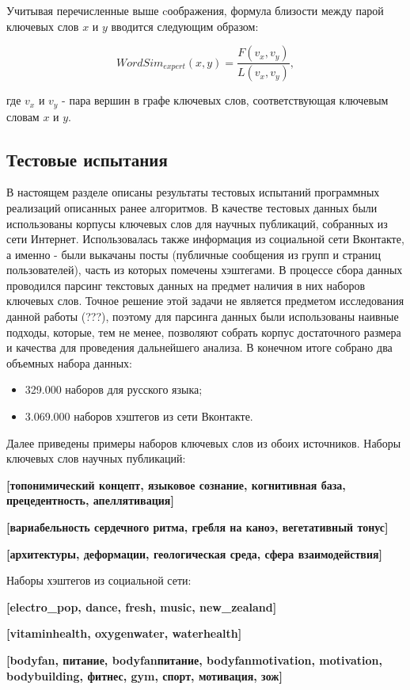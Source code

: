 Учитывая перечисленные выше cоображения, формула близости между парой ключевых слов $x$ и $y$ вводится следующим образом:

$$ WordSim_{expert}(x, y) = \frac{F(v_x, v_y)}{L(v_x, v_y)}, $$

где $v_x$ и $v_y$ - пара вершин в графе ключевых слов, соответствующая ключевым словам $x$ и $y$.


\subsection{Тестовые испытания} \label{test_sect}
В настоящем разделе описаны результаты тестовых испытаний программных реализаций описанных ранее алгоритмов. В качестве тестовых данных были использованы корпусы ключевых слов для научных публикаций, собранных из сети Интернет. Использовалась также информация из социальной сети Вконтакте, а именно - были выкачаны посты (публичные сообщения из групп и страниц пользователей), часть из которых помечены хэштегами. В процессе сбора данных проводился парсинг текстовых данных на предмет наличия в них наборов ключевых слов. Точное решение этой задачи не является предметом исследования данной работы (???), поэтому для парсинга данных были использованы наивные подходы, которые, тем не менее, позволяют собрать корпус достаточного размера и качества  для проведения дальнейшего анализа.
В конечном итоге собрано два объемных набора данных:
\begin{itemize}
    \item 329.000 наборов для русского языка;
    \item 3.069.000 наборов хэштегов из сети Вконтакте.
\end{itemize}
Далее приведены примеры наборов ключевых слов из обоих источников. Наборы ключевых слов научных публикаций:

    \textbf{[топонимический концепт, языковое сознание, когнитивная база, прецедентность, апеллятивация]}\

    \textbf{[вариабельность сердечного ритма, гребля на каноэ, вегетативный тонус]}\
    
    \textbf{[архитектуры, деформации, геологическая среда, сфера взаимодействия]}

Наборы хэштегов из социальной сети:

    \textbf{[electro\_pop, dance, fresh, music, new\_zealand]}\

    \textbf{[vitaminhealth, oxygenwater, waterhealth]}\

    \textbf{[bodyfan, питание, bodyfanпитание, bodyfanmotivation, motivation, bodybuilding, фитнес, gym, спорт, мотивация, зож]}

